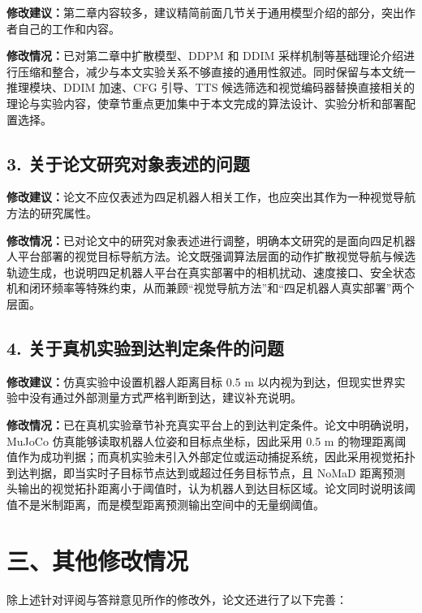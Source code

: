 \documentclass[UTF8,zihao=-4]{ctexart}
\begin{document}
\noindent\textbf{修改建议：}第二章内容较多，建议精简前面几节关于通用模型介绍的部分，突出作者自己的工作和内容。

\noindent\textbf{修改情况：}已对第二章中扩散模型、DDPM 和 DDIM 采样机制等基础理论介绍进行压缩和整合，减少与本文实验关系不够直接的通用性叙述。同时保留与本文统一推理模块、DDIM 加速、CFG 引导、TTS 候选筛选和视觉编码器替换直接相关的理论与实验内容，使章节重点更加集中于本文完成的算法设计、实验分析和部署配置选择。

\subsection*{3. 关于论文研究对象表述的问题}

\noindent\textbf{修改建议：}论文不应仅表述为四足机器人相关工作，也应突出其作为一种视觉导航方法的研究属性。

\noindent\textbf{修改情况：}已对论文中的研究对象表述进行调整，明确本文研究的是面向四足机器人平台部署的视觉目标导航方法。论文既强调算法层面的动作扩散视觉导航与候选轨迹生成，也说明四足机器人平台在真实部署中的相机扰动、速度接口、安全状态机和闭环频率等特殊约束，从而兼顾“视觉导航方法”和“四足机器人真实部署”两个层面。

\subsection*{4. 关于真机实验到达判定条件的问题}

\noindent\textbf{修改建议：}仿真实验中设置机器人距离目标 0.5 m 以内视为到达，但现实世界实验中没有通过外部测量方式严格判断到达，建议补充说明。

\noindent\textbf{修改情况：}已在真机实验章节补充真实平台上的到达判定条件。论文中明确说明，MuJoCo 仿真能够读取机器人位姿和目标点坐标，因此采用 0.5 m 的物理距离阈值作为成功判据；而真机实验未引入外部定位或运动捕捉系统，因此采用视觉拓扑到达判据，即当实时子目标节点达到或超过任务目标节点，且 NoMaD 距离预测头输出的视觉拓扑距离小于阈值时，认为机器人到达目标区域。论文同时说明该阈值不是米制距离，而是模型距离预测输出空间中的无量纲阈值。

\section*{三、其他修改情况}

除上述针对评阅与答辩意见所作的修改外，论文还进行了以下完善：
\end{document}

